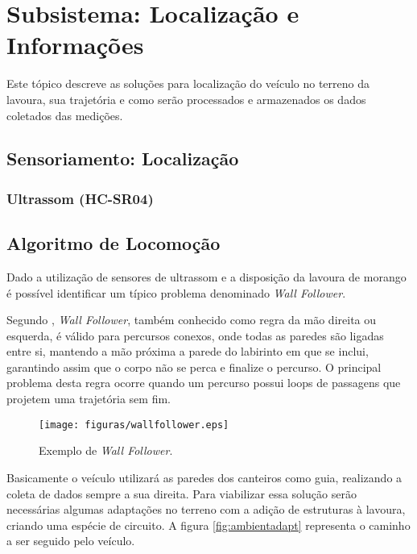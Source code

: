 \section{Subsistema: Localização e Informações}
	Este tópico descreve as soluções para localização do veículo no terreno da lavoura, sua trajetória e
	como serão processados e armazenados os dados coletados das medições.

  \subsection{Sensoriamento: Localização}

  \subsubsection{Ultrassom (HC-SR04)}



  \subsection{Algoritmo de Locomoção}
    Dado a utilização de sensores de ultrassom e a disposição da lavoura de morango
    é possível identificar um típico problema denominado \textit{Wall Follower}.

    Segundo \cite{huang2009}, \textit{Wall Follower},
    também conhecido como regra da mão direita ou esquerda, é válido para percursos conexos, onde todas as paredes são ligadas entre si, mantendo a mão próxima a parede do labirinto em
    que se inclui, garantindo assim que o corpo não se perca e finalize
    o percurso. O principal problema desta regra ocorre quando um percurso
    possui loops de passagens que projetem uma trajetória sem fim. 

    \begin{figure}[!htbp]
    \begin{center}
    \texttt{[image: figuras/wallfollower.eps]}
    \caption{\label{fig:wallfollower}Exemplo de \textit{Wall Follower}.}
    \end{center}
    \end{figure}

    \vfill
    \pagebreak

    Basicamente o veículo utilizará as paredes dos canteiros como guia, realizando a
    coleta de dados sempre a sua direita. Para viabilizar essa solução serão necessárias algumas adaptações no terreno com a adição de estruturas à lavoura, criando uma espécie de circuito. A figura \ref{fig:ambientadapt} representa o caminho a ser seguido pelo veículo.

